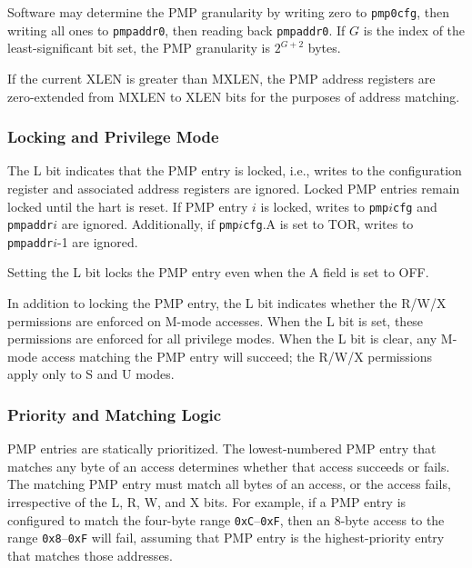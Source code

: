 \begin{commentary}
Software may determine the PMP granularity by writing zero to {\tt pmp0cfg},
then writing all ones to {\tt pmpaddr0}, then reading back {\tt pmpaddr0}.
If $G$ is the index of the least-significant bit set,
the PMP granularity is $2^{G+2}$ bytes.
\end{commentary}

If the current XLEN is greater than MXLEN, the PMP address registers are
zero-extended from MXLEN to XLEN bits for the purposes of address matching.

\subsubsection*{Locking and Privilege Mode}

The L bit indicates that the PMP entry is locked, i.e., writes to the
configuration register and associated address registers are ignored.  Locked
PMP entries remain locked until the hart is reset.  If PMP entry $i$ is
locked, writes to {\tt pmp}$i${\tt cfg} and {\tt pmpaddr}$i$ are ignored.
Additionally, if {\tt pmp}$i${\tt cfg}.A is set to TOR, writes to {\tt
pmpaddr}$i$-1 are ignored.

\begin{commentary}
Setting the L bit locks the PMP entry even when the A field is set to OFF.
\end{commentary}

In addition to locking the PMP entry, the L bit indicates whether the R/W/X
permissions are enforced on M-mode accesses.  When the L bit is set, these
permissions are enforced for all privilege modes.  When the L bit is clear,
any M-mode access matching the PMP entry will succeed; the R/W/X
permissions apply only to S and U modes.

\subsubsection*{Priority and Matching Logic}

PMP entries are statically prioritized.  The lowest-numbered PMP entry that
matches any byte of an access determines whether that access succeeds or
fails.  The matching PMP entry must match all bytes of an access, or the
access fails, irrespective of the L, R, W, and X bits.  For example, if a PMP
entry is configured to match the four-byte range {\tt 0xC}--{\tt 0xF}, then an
8-byte access to the range {\tt 0x8}--{\tt 0xF} will fail, assuming that
PMP entry is the highest-priority entry that matches those addresses.

